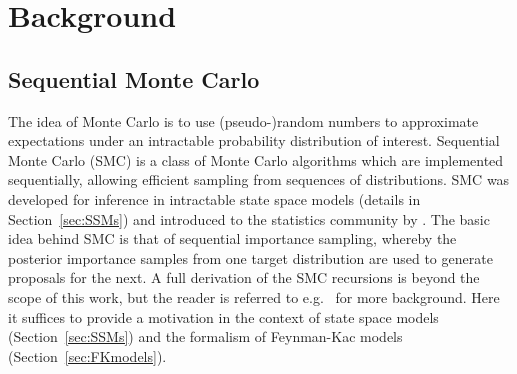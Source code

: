 \chapter{Background}
\label{ch:bg}



\section{Sequential Monte Carlo}
The idea of Monte Carlo is to use (pseudo-)random numbers to approximate expectations under an intractable probability distribution of interest.
Sequential Monte Carlo (SMC) is a class of Monte Carlo algorithms which are implemented sequentially, allowing efficient sampling from sequences of distributions.
SMC was developed for inference in intractable state space models (details in Section~\ref{sec:SSMs}) and introduced to the statistics community by \textcite{gordon1993}.
The basic idea behind SMC is that of sequential importance sampling, whereby the posterior importance samples from one target distribution are used to generate proposals for the next. A full derivation of the SMC recursions is beyond the scope of this work, but the reader is referred to e.g.\ \textcite{doucet2009, chopin2020} for more background. Here it suffices to provide a motivation in the context of state space models (Section~\ref{sec:SSMs}) and the formalism of Feynman-Kac models (Section~\ref{sec:FKmodels}).






